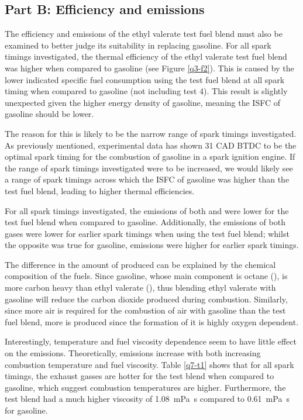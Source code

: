 \subsection*{Part B: Efficiency and emissions}
The efficiency and emissions of the ethyl valerate test fuel blend must also be examined to better judge its suitability in replacing gasoline. For all spark timings investigated, the thermal efficiency of the ethyl valerate test fuel blend was higher when compared to gasoline (see Figure \ref{q3-f2}). This is caused by the lower indicated specific fuel consumption using the test fuel blend at all spark timing when compared to gasoline (not including test 4). This result is slightly unexpected given the higher energy density of gasoline, meaning the ISFC of gasoline should be lower.

The reason for this is likely to be the narrow range of spark timings investigated. As previously mentioned, experimental data has shown 31 CAD BTDC to be the optimal spark timing for the combustion of gasoline in a spark ignition engine. If the range of spark timings investigated were to be increased, we would likely see a range of spark timings across which the ISFC of gasoline was higher than the test fuel blend, leading to higher thermal efficiencies.

For all spark timings investigated, the emissions of both  and  were lower for the test fuel blend when compared to gasoline. Additionally, the emissions of both gases were lower for earlier spark timings when using the test fuel blend; whilst the opposite was true for gasoline, emissions were higher for earlier spark timings.

The difference in the amount of  produced can be explained by the chemical composition of the fuels. Since gasoline, whose main component is octane (), is more carbon heavy than ethyl valerate (), thus blending ethyl valerate with gasoline will reduce the carbon dioxide produced during combustion. Similarly, since more air is required for the combustion of air with gasoline than the test fuel blend, more  is produced since the formation of it is highly oxygen dependent.

Interestingly, temperature and fuel viscosity dependence seem to have little effect on the  emissions. Theoretically,  emissions increase with both increasing combustion temperature and fuel viscosity. Table \ref{q7-t1} shows that for all spark timings, the exhaust gasses are hotter for the test blend when compared to gasoline, which suggest combustion temperatures are higher. Furthermore, the test blend had a much higher viscosity of \SI{1.08}{\milli\pascal\second} compared to \SI{0.61}{\milli\pascal\second} for gasoline.

